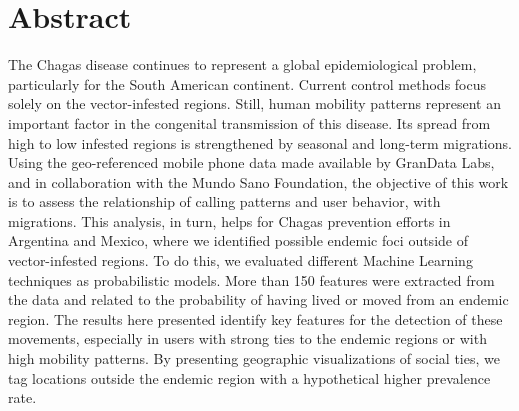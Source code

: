 \chapter{Abstract}
\label{cha:abstract}

The Chagas disease continues to represent a global epidemiological problem, particularly for the South American continent. Current control methods focus solely on the vector-infested regions. Still, human mobility patterns represent an important factor in the congenital transmission of this disease. Its spread from high to low infested regions is strengthened by seasonal and long-term migrations. Using the geo-referenced mobile phone data made available by GranData Labs, and in collaboration with the Mundo Sano Foundation, the objective of this work is to assess the relationship of calling patterns and user behavior, with migrations. This analysis, in turn, helps for Chagas prevention efforts in Argentina and Mexico, where we identified possible endemic foci outside of vector-infested regions. To do this, we evaluated different Machine Learning techniques as probabilistic models. More than 150 features were extracted from the data and related to the probability of having lived or moved from an endemic region. The results here presented identify key features for the detection of these movements, especially in users with strong ties to the endemic regions or with high mobility patterns. By presenting geographic visualizations of social ties, we tag locations outside the endemic region with a hypothetical higher prevalence rate.

